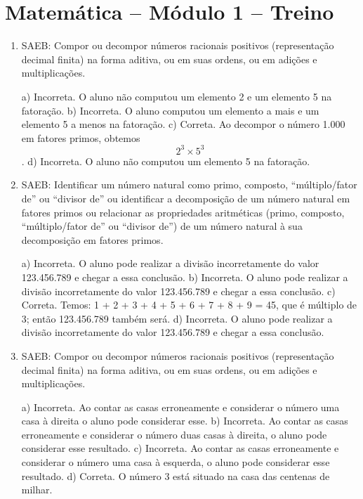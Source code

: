 \pagebreak
\pagestyle{plain}
\footnotesize

\pagecolor{gray!40}

\section*{Matemática – Módulo 1 – Treino}

\begin{enumerate}
\item SAEB: Compor ou decompor números racionais positivos (representação
decimal finita) na forma aditiva, ou em suas ordens, ou em adições e
multiplicações.

a) Incorreta. O aluno não computou um elemento 2 e um elemento 5
na fatoração.
b) Incorreta. O aluno computou um elemento a mais e um elemento 5 a
menos na fatoração.
c) Correta. Ao decompor o número 1.000 em fatores primos, obtemos
$$2^3 \times 5^3$$.
d) Incorreta. O aluno não computou um elemento 5 na fatoração.

\item SAEB: Identificar um número natural como primo, composto,
``múltiplo/fator de'' ou ``divisor de'' ou identificar a decomposição de
um número natural em fatores primos ou relacionar as propriedades
aritméticas (primo, composto, ``múltiplo/fator de'' ou ``divisor de'')
de um número natural à sua decomposição em fatores primos.

a) Incorreta. O aluno pode realizar a divisão incorretamente do
valor 123.456.789 e chegar a essa conclusão.
b) Incorreta. O aluno pode realizar a divisão incorretamente do
valor 123.456.789 e chegar a essa conclusão.
c) Correta. Temos: 1 + 2 + 3 + 4 + 5 + 6 + 7 + 8 + 9 = 45, que é
múltiplo de 3; então 123.456.789 também será.
d) Incorreta. O aluno pode realizar a divisão incorretamente do
valor 123.456.789 e chegar a essa conclusão.

\item SAEB: Compor ou decompor números racionais positivos (representação
decimal finita) na forma aditiva, ou em suas ordens, ou em adições e
multiplicações.

a) Incorreta. Ao contar as casas erroneamente e considerar o
número uma casa à direita o aluno pode considerar esse.
b) Incorreta. Ao contar as casas erroneamente e considerar o
número duas casas à direita, o aluno pode considerar esse resultado.
c) Incorreta. Ao contar as casas erroneamente e considerar o
número uma casa à esquerda, o aluno pode considerar esse resultado.
d) Correta. O número 3 está situado na casa das centenas de milhar.

\end{enumerate}


